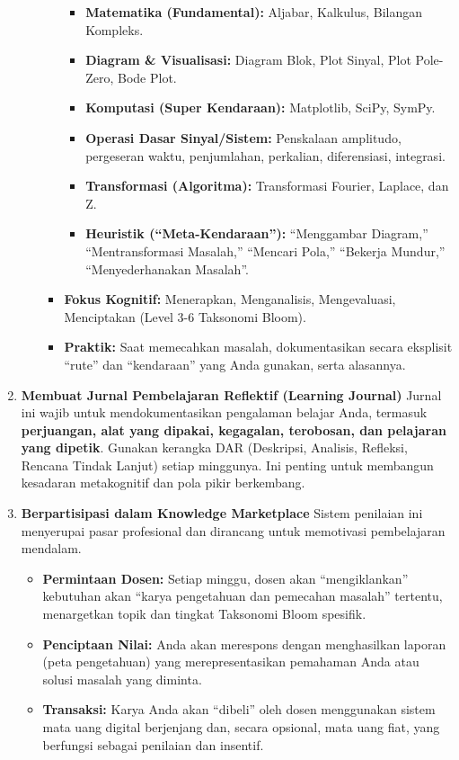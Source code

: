 \documentclass[
  letterpaper,
  DIV=11,
  numbers=noendperiod]{scrreprt}
\providecommand{\tightlist}{%
  \setlength{\itemsep}{0pt}\setlength{\parskip}{0pt}}
\begin{document}
\begin{enumerate}
\begin{itemize}
\begin{itemize}
      \begin{itemize}
      \tightlist
      \item
        \textbf{Matematika (Fundamental):} Aljabar, Kalkulus, Bilangan
        Kompleks.
      \item
        \textbf{Diagram \& Visualisasi:} Diagram Blok, Plot Sinyal, Plot
        Pole-Zero, Bode Plot.
      \item
        \textbf{Komputasi (Super Kendaraan):} Matplotlib, SciPy, SymPy.
      \item
        \textbf{Operasi Dasar Sinyal/Sistem:} Penskalaan amplitudo,
        pergeseran waktu, penjumlahan, perkalian, diferensiasi,
        integrasi.
      \item
        \textbf{Transformasi (Algoritma):} Transformasi Fourier,
        Laplace, dan Z.
      \item
        \textbf{Heuristik (``Meta-Kendaraan''):} ``Menggambar Diagram,''
        ``Mentransformasi Masalah,'' ``Mencari Pola,'' ``Bekerja
        Mundur,'' ``Menyederhanakan Masalah''.
      \end{itemize}
    \item
      \textbf{Fokus Kognitif:} Menerapkan, Menganalisis, Mengevaluasi,
      Menciptakan (Level 3-6 Taksonomi Bloom).
    \item
      \textbf{Praktik:} Saat memecahkan masalah, dokumentasikan secara
      eksplisit ``rute'' dan ``kendaraan'' yang Anda gunakan, serta
      alasannya.
    \end{itemize}
  \end{itemize}
\item
  \textbf{Membuat Jurnal Pembelajaran Reflektif (Learning Journal)}
  Jurnal ini wajib untuk mendokumentasikan pengalaman belajar Anda,
  termasuk \textbf{perjuangan, alat yang dipakai, kegagalan, terobosan,
  dan pelajaran yang dipetik}. Gunakan kerangka DAR (Deskripsi,
  Analisis, Refleksi, Rencana Tindak Lanjut) setiap minggunya. Ini
  penting untuk membangun kesadaran metakognitif dan pola pikir
  berkembang.
\item
  \textbf{Berpartisipasi dalam Knowledge Marketplace} Sistem penilaian
  ini menyerupai pasar profesional dan dirancang untuk memotivasi
  pembelajaran mendalam.

  \begin{itemize}
  \tightlist
  \item
    \textbf{Permintaan Dosen:} Setiap minggu, dosen akan
    ``mengiklankan'' kebutuhan akan ``karya pengetahuan dan pemecahan
    masalah'' tertentu, menargetkan topik dan tingkat Taksonomi Bloom
    spesifik.
  \item
    \textbf{Penciptaan Nilai:} Anda akan merespons dengan menghasilkan
    laporan (peta pengetahuan) yang merepresentasikan pemahaman Anda
    atau solusi masalah yang diminta.
  \item
    \textbf{Transaksi:} Karya Anda akan ``dibeli'' oleh dosen
    menggunakan sistem mata uang digital berjenjang dan, secara
    opsional, mata uang fiat, yang berfungsi sebagai penilaian dan
    insentif.


\end{itemize}
\end{enumerate}
\end{document}
